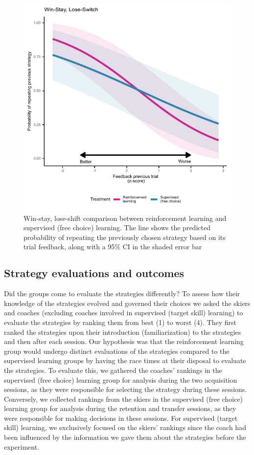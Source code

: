 \documentclass[pdflatex,sn-nature]{sn-jnl}%
\theoremstyle{thmstyleone}%
\theoremstyle{thmstyletwo}%
\theoremstyle{thmstylethree}%
\begin{document}
\begin{figure}[H]
\centering
\includegraphics{figures/figure_winstaylooseshift.pdf}
\caption{Win-stay, lose-shift comparison between reinforcement learning and supervised (free choice) learning. The line shows the predicted probability of repeating the previously chosen strategy based on its trial feedback, along with a 95\% CI in the shaded error bar} \label{fig: choice_wsls}
\end{figure}


\subsection{Strategy evaluations and outcomes}
Did the groups come to evaluate the strategies differently? To assess how their knowledge of the strategies evolved and governed their choices we asked the skiers and coaches (excluding coaches involved in supervised (target skill) learning) to evaluate the strategies by ranking them from best (1) to worst (4). They first ranked the strategies upon their introduction (familiarization) to the strategies and then after each session. Our hypothesis was that the reinforcement learning group would undergo distinct evaluations of the strategies compared to the supervised learning groups by having the race times at their disposal to evaluate the strategies. To evaluate this, we gathered the coaches' rankings in the supervised (free choice) learning group for analysis during the two acquisition sessions, as they were responsible for selecting the strategy during these sessions. Conversely, we collected rankings from the skiers in the supervised (free choice) learning group for analysis during the retention and transfer sessions, as they were responsible for making decisions in these sessions. For supervised (target skill) learning, we exclusively focused on the skiers' rankings since the coach had been influenced by the information we gave them about the strategies before the experiment. 
\end{document}

